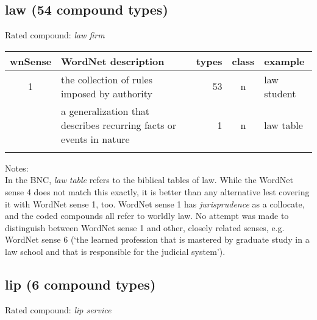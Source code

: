 \pagebreak[3]
\subsection{law         (54 compound types)}
Rated compound: \emph{law firm}


\noindent
\begin{longtable}{c>{\raggedright\arraybackslash}p{5cm}rc>{\raggedright\arraybackslash}p{2cm}}\lsptoprule
{\small wnSense}&WordNet description&types&class&example\\\midrule
 1& the collection of rules imposed by
authority& 53& n& law student\\\tablevspace
4&a generalization that describes recurring facts or events in
nature&1&n&law table\\\lspbottomrule
\end{longtable}

\noindent
Notes:\\
In the BNC, \emph{law table} refers to the biblical tables of
law. While the WordNet sense 4 does not match this exactly, it is
better than any alternative lest covering it with WordNet sense 1, too. WordNet sense 1 has \emph{jurisprudence}
as a collocate, and the coded compounds all refer to worldly law. 
No attempt was made to distinguish between WordNet sense 1 and other,
closely related senses, e.g. WordNet sense 6 (`the learned profession that is mastered by graduate study in a law school and that is responsible for the judicial system').

\subsection{lip          (6 compound types)}
Rated compound: \emph{lip service}


